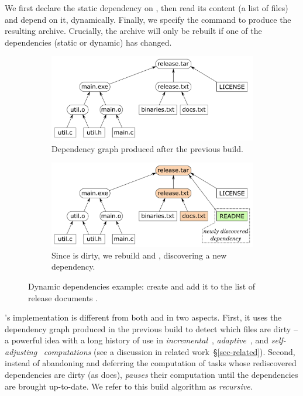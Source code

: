 \noindent
We first declare the static dependency on , then read its
content (a list of files) and depend on it, dynamically. Finally, we specify the
command to produce the resulting archive. Crucially, the archive will only be
rebuilt if one of the dependencies (static or dynamic) has changed.

\begin{figure}[h]
\begin{subfigure}[b]{0.90\linewidth}
\centerline{\includegraphics[scale=0.28]{fig/shake-example.pdf}}
\vspace{-1mm}
\caption{Dependency graph produced after the previous build.}
\vspace{3mm}
\end{subfigure}
\begin{subfigure}[b]{0.90\linewidth}
\centerline{\includegraphics[scale=0.28]{fig/shake-example-rebuild.pdf}}
\vspace{-1mm}
\caption{Since  is dirty, we rebuild  and
, discovering a new dependency.}
\end{subfigure}
\caption{Dynamic dependencies example: create  and add it to the
list of release documents .\label{fig-shake}}
\end{figure}

\Shake's implementation is different from both \Make and \Excel in two aspects.
First, it uses the dependency graph produced in the previous build to detect
which files are dirty -- a powerful idea with a long history of use in
\emph{incremental}~\cite{demers1981incremental},
\emph{adaptive}~\cite{acar2002adaptive}, and
\emph{self-adjusting}~\cite{acar2007selfadjusting} \emph{computations} (see a
discussion in related work~\S\ref{sec-related}). Second, instead of abandoning
and deferring the computation of tasks whose rediscovered dependencies are dirty
(as \Excel does), \Shake \emph{pauses} their computation until the dependencies
are brought up-to-date. We refer to this build algorithm as \emph{recursive}.


